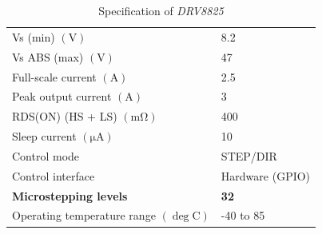 \begin{table}[H]
    \centering
    \captionsetup{justification = centering}
    \begin{tabular}{ll}
        \hline
        Vs (min) $(\mathrm{V})$                     & 8.2                \\
        Vs ABS (max) $(\mathrm{V})$                 & 47                 \\
        Full-scale current $(\mathrm{A})$           & 2.5                \\
        Peak output current $(\mathrm{A})$          & 3                  \\
        RDS(ON) (HS + LS) $(\mathrm{m\Omega})$           & 400                \\
        Sleep current $(\mathrm{\mu A})$               & 10                 \\
        Control mode                     & STEP/DIR           \\
        Control interface                & Hardware (GPIO)    \\
        \textbf{Microstepping levels}             & \textbf{32}                 \\
        Operating temperature range $(\mathrm{\deg C})$ & -40 to 85         \\
        \hline
    \end{tabular}%
    \caption{Specification of \textit{DRV8825}}
    \label{Specification of DRV8825}
\end{table}

